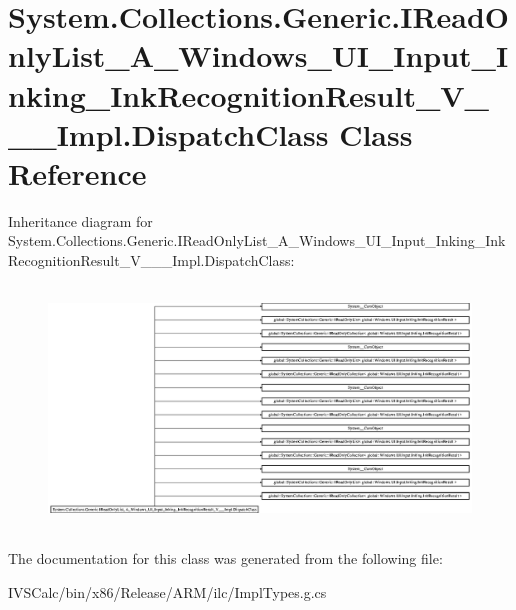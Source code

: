 \hypertarget{class_system_1_1_collections_1_1_generic_1_1_i_read_only_list___a___windows___u_i___input___inkif72c053d1bd88c71eba206e1c7a9feaa}{}\section{System.\+Collections.\+Generic.\+I\+Read\+Only\+List\+\_\+\+A\+\_\+\+Windows\+\_\+\+U\+I\+\_\+\+Input\+\_\+\+Inking\+\_\+\+Ink\+Recognition\+Result\+\_\+\+V\+\_\+\+\_\+\+\_\+\+Impl.\+Dispatch\+Class Class Reference}
\label{class_system_1_1_collections_1_1_generic_1_1_i_read_only_list___a___windows___u_i___input___inkif72c053d1bd88c71eba206e1c7a9feaa}
Inheritance diagram for System.\+Collections.\+Generic.\+I\+Read\+Only\+List\+\_\+\+A\+\_\+\+Windows\+\_\+\+U\+I\+\_\+\+Input\+\_\+\+Inking\+\_\+\+Ink\+Recognition\+Result\+\_\+\+V\+\_\+\+\_\+\+\_\+\+Impl.\+Dispatch\+Class\+:\begin{figure}[H]
\begin{center}
\leavevmode
\includegraphics[height=6.511628cm]{class_system_1_1_collections_1_1_generic_1_1_i_read_only_list___a___windows___u_i___input___inkif72c053d1bd88c71eba206e1c7a9feaa}
\end{center}
\end{figure}


The documentation for this class was generated from the following file\+:\begin{DoxyCompactItemize}
\item 
I\+V\+S\+Calc/bin/x86/\+Release/\+A\+R\+M/ilc/Impl\+Types.\+g.\+cs\end{DoxyCompactItemize}
